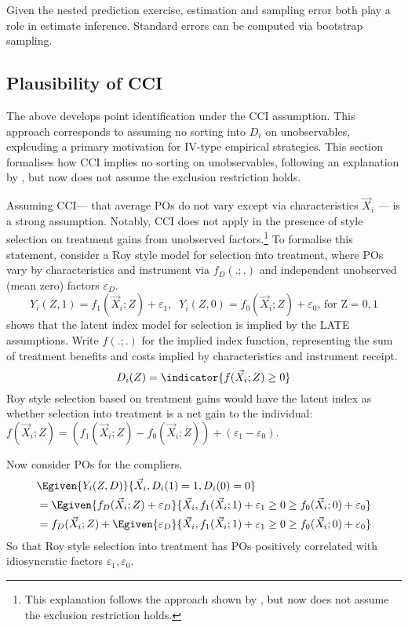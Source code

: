 Given the nested prediction exercise, estimation and sampling error both play a role in estimate inference.
Standard errors can be computed via bootstrap sampling.

\subsection{Plausibility of CCI}
\label{sec:plausibility}

The above develops point identification under the CCI assumption.
This approach corresponds to assuming no sorting into $D_i$ on unobservables, explcuding a primary motivation for IV-type empirical strategies.
This section formalises how CCI implies no sorting on unobservables, following an explanation by \cite{angrist2010extrapolate}, but now does not assume the exclusion restriction holds.

Assuming CCI--- that average POs do not vary except via characteristics $\vec X_i$ --- is a strong assumption.
Notably, CCI does not apply in the presence of \cite{roy1951some} style selection on treatment gains from unobserved factors.\footnote{
    This explanation follows the approach shown by \cite{angrist2010extrapolate}, but now does not assume the exclusion restriction holds.
}
To formalise this statement, consider a Roy style model for selection into treatment, where POs vary by characteristics and instrument via $f_D(.;.)$ and independent unobserved (mean zero) factors $\varepsilon_D$.
\[ Y_i(Z, 1) = f_1(\vec X_i ; Z) + \varepsilon_1, \;\;
    Y_i(Z, 0) = f_0(\vec X_i ; Z) + \varepsilon_0
        \text{, for Z} = 0,1 \]
\cite{vytlacil2002independence} shows that the latent index model for selection is implied by the LATE assumptions.
Write $f(.;.)$ for the implied index function, representing the sum of treatment benefits and costs implied by characteristics and instrument receipt.
\[ D_i(Z) = \indicator{f(\vec X_i; Z) \geq 0} \]
Roy style selection based on treatment gains would have the latent index as whether selection into treatment is a net gain to the individual: $f(\vec X_i ; Z) = \left( f_1(\vec X_i; Z) - f_0(\vec X_i; Z)\right) +
\left( \varepsilon_1 - \varepsilon_0 \right)$.

Now consider POs for the compliers.
\begin{align*}
    &\Egiven{Y_i(Z,D)}{\vec X_i, D_i(1)=1, D_i(0)=0} \\
    &= \Egiven{f_D(\vec X_i ; Z) + \varepsilon_D}{\vec X_i,
        f_1(\vec X_i; 1) + \varepsilon_1 \geq 0 \geq f_0(\vec X_i; 0) + \varepsilon_0} \\
        &= f_D(\vec X_i ; Z) + \Egiven{\varepsilon_D}{\vec X_i,
            f_1(\vec X_i; 1) + \varepsilon_1 \geq 0 \geq f_0(\vec X_i; 0) + \varepsilon_0}
\end{align*}
So that Roy style selection into treatment has POs positively correlated with idiosyncratic factors $\varepsilon_1, \varepsilon_0$.

